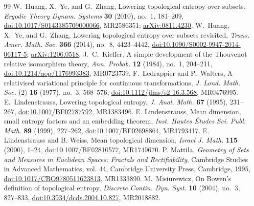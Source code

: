 \documentclass[10pt,a4paper]{amsart}
\numberwithin{equation}{section}
\begin{document}
\begin{thebibliography}{99}
 W.~Huang, X.~Ye, and G.~Zhang, Lowering topological entropy over subsets, \emph{Ergodic Theory Dynam. Systems} \textbf{30} (2010), no.~1, 181--209, \href{https://doi.org/10.1017/S0143385709000066} {doi:10.1017/S0143385709000066}, MR2586351; \href{https://arxiv.org/abs/0811.4230}{arXiv:0811.4230}.
 W.~Huang, X.~Ye, and G.~Zhang, Lowering topological entropy over subsets revisited, \emph{Trans. Amer. Math. Soc.} \textbf{366} (2014), no.~8, 4423--4442, \href{https://doi.org/10.1090/S0002-9947-2014-06117-5} {doi:10.1090/S0002-9947-2014-06117-5}; \href{https://arxiv.org/abs/1206.0518}{arXiv:1206.0518}.
 J.~C.~Kieffer, A simple development of the Thouvenot relative isomorphism theory, \emph{Ann. Probab.} \textbf{12} (1984), no.~1, 204--211, \href{https://doi.org/10.1214/aop/1176993383} {doi:10.1214/aop/1176993383}, MR0723739.
 F.~Ledrappier and P.~Walters, A relativised variational principle for continuous transformations, \emph{J. Lond. Math. Soc.} (2) \textbf{16} (1977), no.~3, 568--576, \href{https://doi.org/10.1112/jlms/s2-16.3.568} {doi:10.1112/jlms/s2-16.3.568}, MR0476995.
 E.~Lindenstrauss, Lowering topological entropy, \emph{J. Anal. Math.} \textbf{67} (1995), 231--267, \href{https://doi.org/10.1007/BF02787792} {doi:10.1007/\allowbreak BF02787792}, MR1383496.
 E. Lindenstrauss, Mean dimension, small entropy factors and an embedding theorem, \emph{Inst. Hautes \'Etudes Sci. Publ. Math.} \textbf{89} (1999), 227--262, \href{https://doi:10.1007/BF02698864} {doi:10.1007/\allowbreak BF02698864}, MR1793417.
 E. Lindenstrauss and B. Weiss, Mean topological dimension, \emph{Israel J. Math.} \textbf{115} (2000), 1--24, \href{https://doi:10.1007/BF02810577} {doi:10.1007/\allowbreak BF02810577}, MR1749670.
 P. Mattila, \emph{Geometry of Sets and Measures in Euclidean Spaces: Fractals and Rectifiability}, Cambridge Studies in Advanced Mathematics, vol. 44, Cambridge University Press, Cambridge, 1995, \href{https://doi:10.1017/CBO9780511623813}{doi:10.1017/CBO9780511623813}, MR1333890.
 M.~Misiurewicz, On Bowen's definition of topological entropy, \emph{Discrete Contin. Dyn. Syst.} \textbf{10} (2004), no.~3, 827--833, \href{https://doi.org/10.3934/dcds.2004.10.827} {doi:10.3934/dcds.2004.10.827}, MR2018882.

\end{thebibliography}
\end{document}
